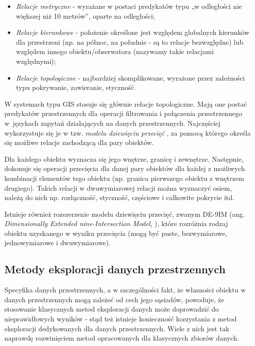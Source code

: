 \documentclass[12pt]{article}
\begin{document}
\begin{itemize}
\item \textit{Relacje metryczne} - wyrażane w postaci predykatów typu „w odległości nie większej niż 10 metrów”, oparte na odległości;
\item \textit{Relacje kierunkowe} - położenie określone jest względem globalnych kierunków dla przestrzeni (np. na północ, na południe - są to relacje bezwzględne) lub względem innego obiektu/obserwatora (nazywamy takie relacjami względnymi);
\item \textit{Relacje topologiczne} - najbardziej skomplikowane, wyrażone przez zależności typu pokrywanie, zawieranie, styczność.
\end{itemize}

W systemach typu GIS stosuje się głównie relacje topologiczne. Mają one postać predykatów przestrzennych dla operacji filtrowania i połączenia przestrzennego w~językach zapytań działających na danych przestrzennych. Najczęściej wykorzystuje się je w tzw. \textit{modelu dziewięciu przecięć} \cite{9sec}, za pomocą którego określa się możliwe relacje zachodzącą dla pary obiektów.

Dla każdego obiektu wyznacza się jego wnętrze, granicę i zewnętrze. Następnie, dokonuje się operacji przecięcia dla danej pary obiektów dla każdej z możliwych kombinacji elementów tego obiektu (np. granica pierwszego obiektu z wnętrzem drugiego). Takich relacji w dwuwymiarowej relacji można wyznaczyć osiem, należą do nich np. rozłączność, styczność, częściowe i całkowite pokrycie itd. 

Istnieje również rozszerzenie modelu dziewięciu przecięć, zwanym DE-9IM (ang. \textit{Dimensionally Extended nine-Intersection Model}, \cite{9sec2}), które rozróżnia rodzaj obiektu uzyskanego w wyniku przecięcia (mogą być puste, bezwymiarowe, jednowymiarowe i dwuwymiarowe). 

\subsection{Metody eksploracji danych przestrzennych}

Specyfika danych przestrzennych, a w szczególności fakt, że własności obiektu w danych przestrzennych mogą zależeć od cech jego sąsiadów, powoduje, że stosowanie klasycznych metod eksploracji danych może doprowadzić do nieprawidłowych wyników \cite{trad} \cite{trad2} - stąd też istnieje konieczność korzystania z metod eksploracji dedykowanych dla danych przestrzennych. Wiele z nich jest tak naprawdę rozwinięciem metod opracowanych dla klasycznych zbiorów danych.
\end{document}
